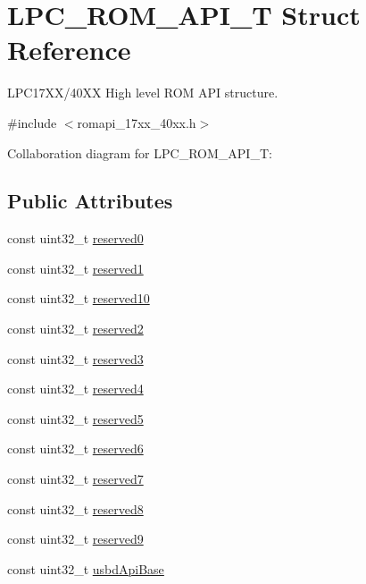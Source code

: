 \hypertarget{structLPC__ROM__API__T}{}\section{L\+P\+C\+\_\+\+R\+O\+M\+\_\+\+A\+P\+I\+\_\+T Struct Reference}
\label{structLPC__ROM__API__T}


L\+P\+C17\+X\+X/40\+XX High level R\+OM A\+PI structure.  




{\ttfamily \#include $<$romapi\+\_\+17xx\+\_\+40xx.\+h$>$}



Collaboration diagram for L\+P\+C\+\_\+\+R\+O\+M\+\_\+\+A\+P\+I\+\_\+T\+:
\subsection*{Public Attributes}
\begin{DoxyCompactItemize}
\item 
const uint32\+\_\+t \hyperlink{structLPC__ROM__API__T_a93487c5be9000ba3b633bd6c354f8589}{reserved0}
\item 
const uint32\+\_\+t \hyperlink{structLPC__ROM__API__T_a2fce9202473b5986d54262b3d5548e82}{reserved1}
\item 
const uint32\+\_\+t \hyperlink{structLPC__ROM__API__T_afb1226faead704ffe1e0c7c5efcb86f2}{reserved10}
\item 
const uint32\+\_\+t \hyperlink{structLPC__ROM__API__T_a0ab9f56adf03f0f69b04baa60bcc271a}{reserved2}
\item 
const uint32\+\_\+t \hyperlink{structLPC__ROM__API__T_a70c7b14958f6d5af166224d04148e945}{reserved3}
\item 
const uint32\+\_\+t \hyperlink{structLPC__ROM__API__T_a1d3193c8ed079cf1c5006dce51686598}{reserved4}
\item 
const uint32\+\_\+t \hyperlink{structLPC__ROM__API__T_a1e6687c757f30d286d1ae661c0863026}{reserved5}
\item 
const uint32\+\_\+t \hyperlink{structLPC__ROM__API__T_a425b87f3b0f5ce258583e9e965829606}{reserved6}
\item 
const uint32\+\_\+t \hyperlink{structLPC__ROM__API__T_a7a9d7f0aa59c70ff085c59291594d22c}{reserved7}
\item 
const uint32\+\_\+t \hyperlink{structLPC__ROM__API__T_a81674fc569de19c3dd861c1f87df1d44}{reserved8}
\item 
const uint32\+\_\+t \hyperlink{structLPC__ROM__API__T_aae524e6f969485072d45b577c7501abc}{reserved9}
\item 
const uint32\+\_\+t \hyperlink{structLPC__ROM__API__T_a94bc8146ba697eeadc992d4985971550}{usbd\+Api\+Base}
\end{DoxyCompactItemize}


